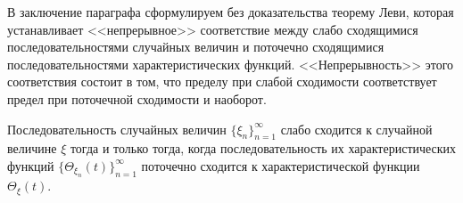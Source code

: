 В заключение параграфа сформулируем без доказательства теорему Леви, которая устанавливает <<непрерывное>> соответствие между слабо сходящимися последовательностями случайных величин и поточечно сходящимися последовательностями характеристических функций. <<Непрерывность>> этого соответствия состоит в том, что пределу при слабой сходимости соответствует предел при поточечной сходимости и наоборот.

\begin{theorem}
\label{th:24.13}
Последовательность случайных величин $\{\xi_n \}_{n=1}^{\infty}$ слабо сходится к случайной величине $\xi$
тогда и только тогда, когда последовательность их характеристических функций $\{\Theta_{\xi_n} (t)\}_{n=1}^{\infty}$ поточечно сходится к характеристической функции $\Theta_{\xi} (t)$.
\end{theorem}